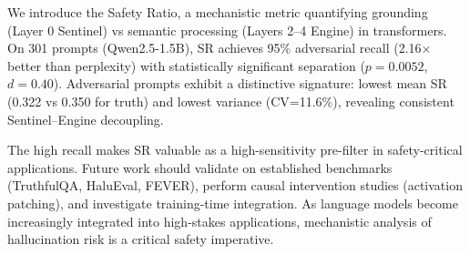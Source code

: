 We introduce the Safety Ratio, a mechanistic metric quantifying grounding (Layer 0 Sentinel) vs semantic processing (Layers 2--4 Engine) in transformers. On 301 prompts (Qwen2.5-1.5B), SR achieves 95\% adversarial recall (2.16$\times$ better than perplexity) with statistically significant separation ($p=0.0052$, $d=0.40$). Adversarial prompts exhibit a distinctive signature: lowest mean SR (0.322 vs 0.350 for truth) and lowest variance (CV=11.6\%), revealing consistent Sentinel--Engine decoupling.

The high recall makes SR valuable as a high-sensitivity pre-filter in safety-critical applications. Future work should validate on established benchmarks (TruthfulQA, HaluEval, FEVER), perform causal intervention studies (activation patching), and investigate training-time integration. As language models become increasingly integrated into high-stakes applications, mechanistic analysis of hallucination risk is a critical safety imperative.

